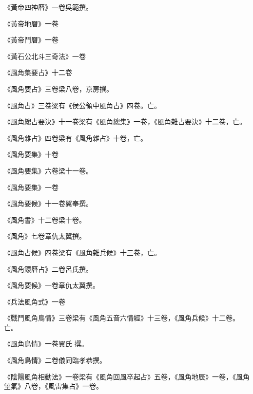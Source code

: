 \begin{pinyinscope}
 《黃帝四神曆》一卷吳範撰。



 《黃帝地曆》一卷



 《黃帝鬥曆》一卷



 《黃石公北斗三奇法》一卷



 《風角集要占》十二卷



 《風角要占》三卷梁八卷，京房撰。



 《風角占》三卷梁有《侯公領中風角占》四卷。亡。



 《風角總占要決》十一卷梁有《風角總集》一卷，《風角雜占要決》十二卷，亡。



 《風角雜占》四卷梁有《風角雜占》十卷，亡。



 《風角要集》十卷



 《風角要集》六卷梁十一卷。



 《風角要集》一卷



 《風角要候》十一卷翼奉撰。



 《風角書》十二卷梁十卷。



 《風角》七卷章仇太翼撰。



 《風角占候》四卷梁有《風角雜兵候》十三卷，亡。



 《風角鐶曆占》二卷呂氏撰。



 《風角要候》一卷章仇太翼撰。



 《兵法風角式》一卷



 《戰鬥風角鳥情》三卷梁有《風角五音六情經》十三卷，《風角兵候》十二卷。亡。



 《風角鳥情》一卷翼氏
 撰。



 《風角鳥情》二卷儀同臨孝恭撰。



 《陰陽風角相動法》一卷梁有《風角回風卒起占》五卷，《風角地辰》一卷，《風角望氣》八卷，《風雷集占》一卷。




\end{pinyinscope}
